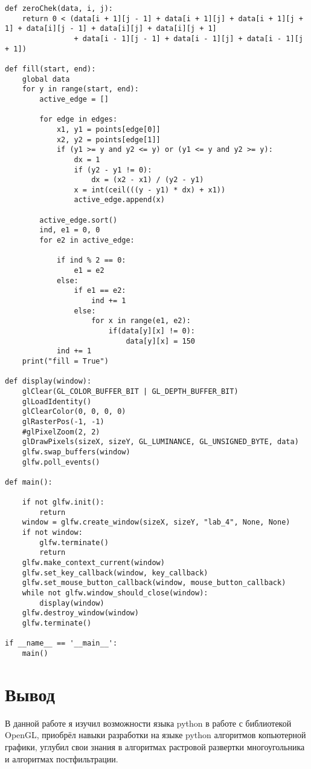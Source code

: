 \documentclass[a4paper, 14pt]{extarticle}
\begin{document}
\begin{verbatim}
def zeroChek(data, i, j):
    return 0 < (data[i + 1][j - 1] + data[i + 1][j] + data[i + 1][j + 1] + data[i][j - 1] + data[i][j] + data[i][j + 1]
                + data[i - 1][j - 1] + data[i - 1][j] + data[i - 1][j + 1])

def fill(start, end): 
    global data
    for y in range(start, end):
        active_edge = []

        for edge in edges:
            x1, y1 = points[edge[0]]
            x2, y2 = points[edge[1]]
            if (y1 >= y and y2 <= y) or (y1 <= y and y2 >= y):
                dx = 1
                if (y2 - y1 != 0):
                    dx = (x2 - x1) / (y2 - y1)
                x = int(ceil(((y - y1) * dx) + x1))
                active_edge.append(x)

        active_edge.sort()
        ind, e1 = 0, 0
        for e2 in active_edge:

            if ind % 2 == 0:
                e1 = e2
            else:
                if e1 == e2:
                    ind += 1
                else:
                    for x in range(e1, e2):
                        if(data[y][x] != 0):
                            data[y][x] = 150
            ind += 1
    print("fill = True")

def display(window):
    glClear(GL_COLOR_BUFFER_BIT | GL_DEPTH_BUFFER_BIT)
    glLoadIdentity()
    glClearColor(0, 0, 0, 0)
    glRasterPos(-1, -1)
    #glPixelZoom(2, 2)
    glDrawPixels(sizeX, sizeY, GL_LUMINANCE, GL_UNSIGNED_BYTE, data)
    glfw.swap_buffers(window)
    glfw.poll_events()
      
def main():

    if not glfw.init():
        return
    window = glfw.create_window(sizeX, sizeY, "lab_4", None, None)
    if not window:
        glfw.terminate()
        return
    glfw.make_context_current(window)
    glfw.set_key_callback(window, key_callback)
    glfw.set_mouse_button_callback(window, mouse_button_callback)
    while not glfw.window_should_close(window):
        display(window)
    glfw.destroy_window(window)
    glfw.terminate()

if __name__ == '__main__':
    main()
\end{verbatim}

\section{Вывод}

В данной работе я изучил возможности языка python в работе с библиотекой OpenGL, приобрёл навыки разработки на языке python алгоритмов копьютерной графики, углубил свои знания в  алгоритмах растровой развертки многоугольника и алгоритмах постфильтрации. 
\end{document}
